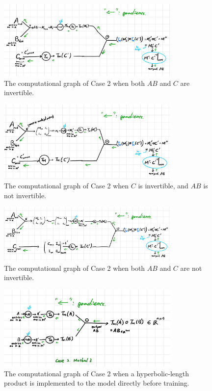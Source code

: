 \documentclass{article}
\theoremstyle{plain}
\theoremstyle{plain} %
\theoremstyle{definition}  %
\theoremstyle{remark}  %
\theoremstyle{plain}
\begin{document}
\begin{figure}[H]
\caption{The computational graph of Case 2 when both $AB$ and $C$ are invertible.}
\centering
\includegraphics[width=0.8\textwidth]{2.png}
\end{figure}

\begin{figure}[H]
\caption{The computational graph of Case 2 when $C$ is invertible, and $AB$ is not invertible.}
\centering
\includegraphics[width=0.8\textwidth]{5.png}
\end{figure}

\begin{figure}[H]
\caption{The computational graph of Case 2 when both $AB$ and $C$ are not invertible.}
\centering
\includegraphics[width=0.8\textwidth]{4.png}
\end{figure}

\begin{figure}[H]
\caption{The computational graph of Case 2 when a hyperbolic-length product is implemented to the model directly before training.}
\centering
\includegraphics[width=0.8\textwidth]{3.png}
\end{figure}
\end{document}
